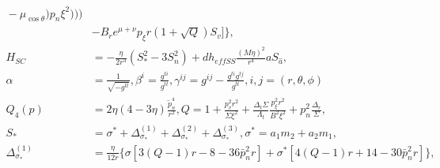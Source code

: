 \documentclass[prd,aps,a4paper,superscriptaddress,twocolumn,footinbib,showpacs]{revtex4}
\begin{document}
\begin{widetext}
\begin{align}
{}-\mu_{\cos\theta})p_n\xi^2)))\nonumber\\
&-B_re^{\mu+\nu}p_\xi r(1+\sqrt{Q})S_v]\},\\
H_{SC}&=-\frac{\eta}{2r^3}(S_*^2-3S_n^2)
+dh_{effSS}\frac{(M\eta)^2}{r^4}aS_{\hat{a}},\\
\alpha&=\frac{1}{\sqrt{-g^{tt}}},\beta^i=\frac{g^{ti}}{g^{tt}},\gamma^{ij}=g^{ij}-\frac{g^{ti}g^{tj}}{g^{tt}},
i,j=(r,\theta,\phi)\\
Q_4(p)&=2\eta(4-3\eta)\frac{\tilde{p}_n^4}{r^2},
Q=1+\frac{p_v^2r^2}{\Sigma\xi^2}
+\frac{\Delta_t\Sigma}{\Lambda_t}\frac{p_\xi^2r^2}{B^2\xi^2}
+p_n^2\frac{\Delta_r}{\Sigma},\\
S_*&=\sigma^*+\Delta^{(1)}_{\sigma_*}+\Delta^{(2)}_{\sigma_*}+\Delta^{(3)}_{\sigma_*},\sigma^*=a_1m_2+a_2m_1,\\
\Delta^{(1)}_{\sigma_*}&=\frac{\eta}{12r}\{\sigma[3(Q-1)r-8-36\bar{p}_n^2r]
+\sigma^*[4(Q-1)r+14-30\bar{p}_n^2r]\},\\

\end{align}
\end{widetext}
\end{document}
